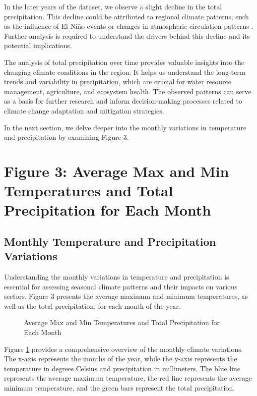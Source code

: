 \documentclass{article}
\begin{document}
\begin{enumerate}
In the later years of the dataset, we observe a slight decline in the total precipitation. This decline could be attributed to regional climate patterns, such as the influence of El Niño events or changes in atmospheric circulation patterns \cite{chen2015influence}. Further analysis is required to understand the drivers behind this decline and its potential implications.

The analysis of total precipitation over time provides valuable insights into the changing climate conditions in the region. It helps us understand the long-term trends and variability in precipitation, which are crucial for water resource management, agriculture, and ecosystem health. The observed patterns can serve as a basis for further research and inform decision-making processes related to climate change adaptation and mitigation strategies.

In the next section, we delve deeper into the monthly variations in temperature and precipitation by examining Figure 3.

\section{Figure 3: Average Max and Min Temperatures and Total Precipitation for Each Month}

\subsection{Monthly Temperature and Precipitation Variations}

Understanding the monthly variations in temperature and precipitation is essential for assessing seasonal climate patterns and their impacts on various sectors. Figure 3 presents the average maximum and minimum temperatures, as well as the total precipitation, for each month of the year.

\begin{figure}[h]
  \centering
  \caption{Average Max and Min Temperatures and Total Precipitation for Each Month}
  \label{fig:monthly_variations}
\end{figure}

Figure \ref{fig:monthly_variations} provides a comprehensive overview of the monthly climate variations. The x-axis represents the months of the year, while the y-axis represents the temperature in degrees Celsius and precipitation in millimeters. The blue line represents the average maximum temperature, the red line represents the average minimum temperature, and the green bars represent the total precipitation.


\end{enumerate}
\end{document}
